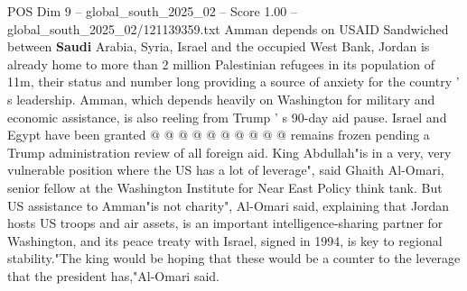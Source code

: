 \begin{textsample}{POS Dim 9 – global\_south\_2025\_02 – Score 1.00 – global\_south\_2025\_02/121139359.txt}
Amman depends on USAID Sandwiched between \textbf{Saudi} Arabia, Syria, Israel and the occupied West Bank, Jordan is already home to more than 2 million Palestinian refugees in its population of 11m, their status and number long providing a source of anxiety for the country ' s leadership.
Amman, which depends heavily on Washington for military and economic assistance, is also reeling from Trump ' s 90-day aid pause.
Israel and Egypt have been granted @ @ @ @ @ @ @ @ @ @ remains frozen pending a Trump administration review of all foreign aid.
King Abdullah"is in a very, very vulnerable position where the US has a lot of leverage", said Ghaith Al-Omari, senior fellow at the Washington Institute for Near East Policy think tank.
But US assistance to Amman"is not charity", Al-Omari said, explaining that Jordan hosts US troops and air assets, is an important intelligence-sharing partner for Washington, and its peace treaty with Israel, signed in 1994, is key to regional stability."The king would be hoping that these would be a counter to the leverage that the president has,"Al-Omari said.

\end{textsample}
